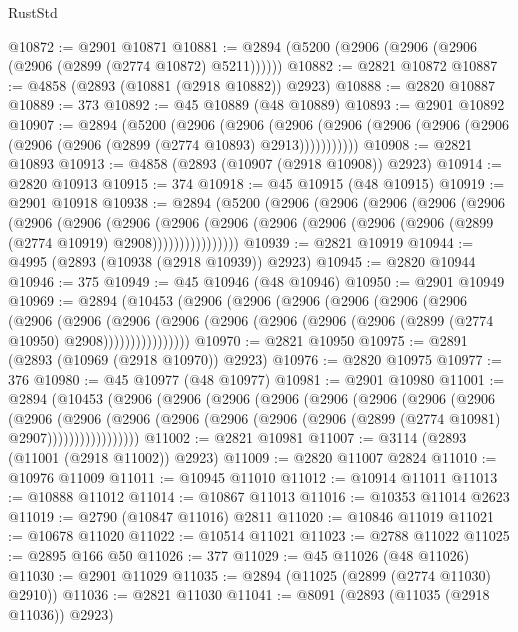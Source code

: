 \begin{lexlean}{RustStd}
\begin{coremodule}
@10872 := @2901 @10871
@10881 := @2894 (@5200 (@2906 (@2906 (@2906 (@2906 (@2899 (@2774 @10872) @5211))))))
@10882 := @2821 @10872
@10887 := @4858 (@2893 (@10881 (@2918 @10882)) @2923)
@10888 := @2820 @10887
@10889 := 373
@10892 := @45 @10889 (@48 @10889)
@10893 := @2901 @10892
@10907 := @2894
    (@5200
      (@2906
        (@2906
          (@2906 (@2906 (@2906 (@2906 (@2906 (@2906 (@2906 (@2899 (@2774 @10893) @2913)))))))))))
@10908 := @2821 @10893
@10913 := @4858 (@2893 (@10907 (@2918 @10908)) @2923)
@10914 := @2820 @10913
@10915 := 374
@10918 := @45 @10915 (@48 @10915)
@10919 := @2901 @10918
@10938 := @2894
    (@5200
      (@2906
        (@2906
          (@2906
            (@2906
              (@2906
                (@2906
                  (@2906
                    (@2906
                      (@2906
                        (@2906
                          (@2906 (@2906 (@2906 (@2906 (@2899 (@2774 @10919) @2908))))))))))))))))
@10939 := @2821 @10919
@10944 := @4995 (@2893 (@10938 (@2918 @10939)) @2923)
@10945 := @2820 @10944
@10946 := 375
@10949 := @45 @10946 (@48 @10946)
@10950 := @2901 @10949
@10969 := @2894
    (@10453
      (@2906
        (@2906
          (@2906
            (@2906
              (@2906
                (@2906
                  (@2906
                    (@2906
                      (@2906
                        (@2906
                          (@2906 (@2906 (@2906 (@2906 (@2899 (@2774 @10950) @2908))))))))))))))))
@10970 := @2821 @10950
@10975 := @2891 (@2893 (@10969 (@2918 @10970)) @2923)
@10976 := @2820 @10975
@10977 := 376
@10980 := @45 @10977 (@48 @10977)
@10981 := @2901 @10980
@11001 := @2894
    (@10453
      (@2906
        (@2906
          (@2906
            (@2906
              (@2906
                (@2906
                  (@2906
                    (@2906
                      (@2906
                        (@2906
                          (@2906
                            (@2906 (@2906 (@2906 (@2906 (@2899 (@2774 @10981) @2907)))))))))))))))))
@11002 := @2821 @10981
@11007 := @3114 (@2893 (@11001 (@2918 @11002)) @2923)
@11009 := @2820 @11007 @2824
@11010 := @10976 @11009
@11011 := @10945 @11010
@11012 := @10914 @11011
@11013 := @10888 @11012
@11014 := @10867 @11013
@11016 := @10353 @11014 @2623
@11019 := @2790 (@10847 @11016) @2811
@11020 := @10846 @11019
@11021 := @10678 @11020
@11022 := @10514 @11021
@11023 := @2788 @11022
@11025 := @2895 @166 @50
@11026 := 377
@11029 := @45 @11026 (@48 @11026)
@11030 := @2901 @11029
@11035 := @2894 (@11025 (@2899 (@2774 @11030) @2910))
@11036 := @2821 @11030
@11041 := @8091 (@2893 (@11035 (@2918 @11036)) @2923)

\end{coremodule}
\end{lexlean}
